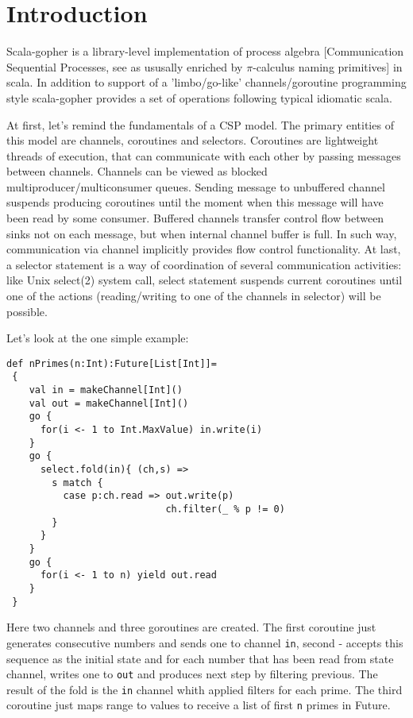 \documentclass[12pt]{article}
\begin{document}
\maketitle


\section{Introduction}

 Scala-gopher is a library-level implementation of process algebra [Communication Sequential Processes, see \cite{Hoare85communicatingsequential} as ususally enriched by $\pi$-calculus \cite{Milner:1992:CMP:162037.162038} naming primitives] in scala. In addition to support of a 'limbo/go-like' \cite{Inferno:Limbo}  \cite{golang} channels/goroutine programming style scala-gopher provides a set of operations following typical idiomatic scala. 

    At first, let's remind the fundamentals of a CSP model. The primary entities of this model are channels, coroutines and selectors. Coroutines are lightweight threads of execution, that can communicate with each other by passing messages between channels. Channels can be viewed as blocked multiproducer/multiconsumer queues. Sending message to unbuffered channel suspends producing coroutines until the moment when this message will have been read by some consumer. Buffered channels transfer control flow between sinks not on each message, but when internal channel buffer is full.  
In such way, communication via channel implicitly provides flow control functionality.  At last, a selector statement is a way of coordination of several communication activities: like Unix select(2) system call, select statement suspends current coroutines until one of the actions (reading/writing to one of the channels in selector) will be possible.

   Let's look at the one simple example:
\begin{Verbatim}[fontsize=\small]
 def nPrimes(n:Int):Future[List[Int]]=
 {
    val in = makeChannel[Int]()
    val out = makeChannel[Int]()
    go {
      for(i <- 1 to Int.MaxValue) in.write(i)
    }
    go {
      select.fold(in){ (ch,s) =>
        s match {
          case p:ch.read => out.write(p)
                            ch.filter(_ % p != 0)
        }
      }
    }
    go {
      for(i <- 1 to n) yield out.read
    }
 }
\end{Verbatim}
  Here two channels and three goroutines are created.  The first coroutine just generates consecutive numbers and sends one to channel \verb|in|, second - accepts this sequence as the initial state and for each number that has been read from state channel, writes one to \verb|out| and produces next step by filtering previous. The result of the fold is the \verb|in| channel whith applied filters for each prime. The third coroutine just maps range to values to receive a list of first \verb|n| primes in Future.
\end{document}
